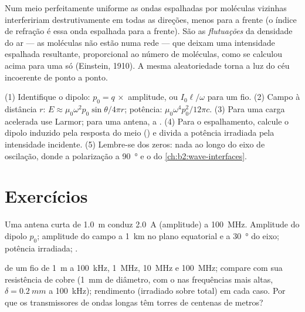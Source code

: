 \begin{remark}\label{rem:b2:dipole-radiation:why}
Num meio perfeitamente uniforme as ondas espalhadas por moléculas
vizinhas interfeririam destrutivamente em todas as direções, menos para a frente
(o índice de refração é essa onda espalhada para a frente). São as
\emph{flutuações} da densidade do ar --- as moléculas não estão numa
rede --- que deixam uma intensidade espalhada resultante, proporcional ao
número de moléculas, como se calculou acima para uma só (Einstein, 1910). A
mesma aleatoriedade torna a luz do céu incoerente de ponto a ponto.
\end{remark}

\begin{method}\label{met:b2:dipole-radiation:method}
(1) Identifique o dipolo: $p_0 = q\,\times$ amplitude, ou $I_0\ell/\omega$ para um
fio. (2) Campo à distância $r$: $E \approx \mu_0\omega^2p_0\sin\theta/4\pi r$; potência:
$\mu_0\omega^4p_0^2/12\pi c$. (3) Para uma carga acelerada use Larmor; para
uma antena, a . (4) Para o espalhamento, calcule o
dipolo induzido pela resposta do meio () e divida
a potência irradiada pela intensidade incidente. (5) Lembre-se dos zeros:
nada ao longo do eixo de oscilação, donde a polarização a
\qty{90}{\degree} e o  do \cref{ch:b2:wave-interfaces}.
\end{method}

\section{Exercícios}

\begin{exercise}[$\star$]\label{exo:b2:dipole-radiation:1}
Uma antena curta de \qty{1.0}{m} conduz \qty{2.0}{A} (amplitude) a
\qty{100}{MHz}. Amplitude do dipolo $p_0$; amplitude do campo a \qty{1}{km} no
plano equatorial e a \qty{30}{\degree} do eixo; potência irradiada;
.
\end{exercise}

\begin{exercise}[$\star$]\label{exo:b2:dipole-radiation:2}
 de um fio de \qty{1}{m} a \qty{100}{kHz}, \qty{1}{MHz},
\qty{10}{MHz} e \qty{100}{MHz}; compare com sua resistência de cobre
(\qty{1}{mm} de diâmetro, com o  nas frequências mais altas,
$\delta = \qty{0.2}{mm}$ a \qty{100}{kHz}); rendimento (irradiado sobre total)
em cada caso. Por que os transmissores de ondas longas têm torres de centenas de
metros?
\end{exercise}

